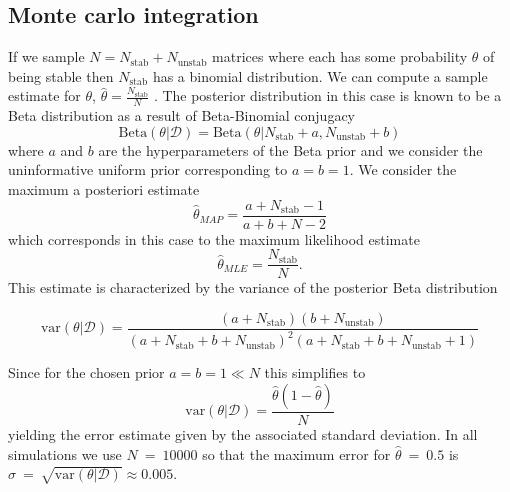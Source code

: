 \subsection{Monte carlo integration}
If we sample $N = N_{\mathrm{stab}} + N_{\mathrm{unstab}}$ matrices where each has some probability $\theta$ of being stable then $N_{\mathrm{stab}}$ has a binomial distribution. We can compute a sample estimate for $\theta$, $\hat{\theta} = \frac{N_{\mathrm{stab}}}{N}$ \cite{Murphy2012}. The posterior distribution in this case is known to be a Beta distribution as a result of Beta-Binomial conjugacy
$$
\mathrm{Beta}(\theta | \mathcal{D}) = \mathrm{Beta}(\theta | N_{\mathrm{stab}} + a, N_{\mathrm{unstab}} + b)
$$
where $a$ and $b$ are the hyperparameters of the Beta prior and we consider the uninformative uniform prior corresponding to $a=b=1$. We consider the maximum a posteriori estimate
$$\hat{\theta}_{MAP} = \frac{a + N_{\mathrm{stab}} - 1}{a + b + N - 2}$$
which corresponds in this case to the maximum likelihood estimate
$$
\hat{\theta}_{MLE} = \frac{N_{\mathrm{stab}}}{N}.
$$
This estimate is characterized by the variance of the posterior Beta distribution
\begin{widetext}
$$
\mathrm{var}(\theta | \mathcal{D}) = \frac{(a+N_{\mathrm{stab}})(b+N_{\mathrm{unstab}})}{(a + N_{\mathrm{stab}} + b + N_{\mathrm{unstab}})^2(a + N_{\mathrm{stab}} + b + N_{\mathrm{unstab}}+1)}
$$
\end{widetext}
Since for the chosen prior $a=b=1 \ll N$ this simplifies to
$$
\mathrm{var}(\theta | \mathcal{D}) = \frac{\hat{\theta}(1-\hat{\theta})}{N}
$$
yielding the error estimate given by the associated standard deviation. In all simulations we use $N~=~10000$ so that the maximum error for $\hat{\theta}~=~0.5$ is $\sigma~=~\sqrt{\mathrm{var}(\theta | \mathcal{D})} \approx 0.005$.
